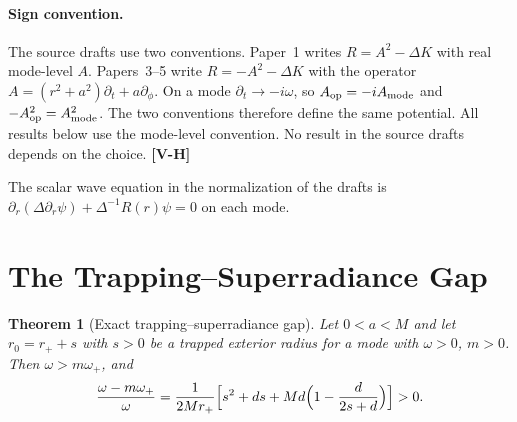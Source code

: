 \documentclass[11pt, a4paper]{article}
\newcommand{\VH}{\textcolor{vh}{\textbf{[V-H]}}}
\newtheorem{theorem}{Theorem}[section]
\theoremstyle{remark}
\theoremstyle{definition}
\begin{document}
\paragraph{Sign convention.} The source drafts use two conventions. Paper~1 writes $R = A^2 - \Delta K$ with real mode-level $A$. Papers~3--5 write $R = -A^2 - \Delta K$ with the operator $A = (r^2+a^2)\partial_t + a\partial_\phi$. On a mode $\partial_t \to -i\omega$, so $A_{\rm op} = -iA_{\rm mode}$ and $-A_{\rm op}^2 = A_{\rm mode}^2$. The two conventions therefore define the same potential. All results below use the mode-level convention. No result in the source drafts depends on the choice. \VH

The scalar wave equation in the normalization of the drafts is $\partial_r(\Delta \partial_r\psi) + \Delta^{-1}R(r)\psi = 0$ on each mode.

\section{The Trapping--Superradiance Gap}
\label{sec:gap1}

\begin{theorem}[Exact trapping--superradiance gap]
\label{thm:gap}
Let $0<a<M$ and let $r_0 = r_+ + s$ with $s>0$ be a trapped exterior radius for a mode with $\omega>0$, $m>0$. Then $\omega > m\omega_+$, and
\begin{equation}
\frac{\omega - m\omega_+}{\omega} = \frac{1}{2Mr_+}\Bigl[s^2 + ds + Md\Bigl(1 - \frac{d}{2s+d}\Bigr)\Bigr] > 0. \label{eq:gap}
\end{equation}
\end{theorem}
\end{document}
